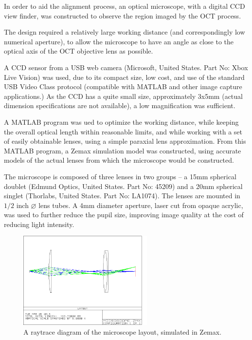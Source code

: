 In order to aid the alignment process, an optical microscope, with a digital CCD view finder, was constructed to observe the region imaged by the OCT process.

The design required a relatively large working distance (and correspondingly low numerical aperture), to allow the microscope to have an angle as close to the optical axis of the OCT objective lens as possible.

A CCD sensor from a USB web camera (Microsoft, United States. Part No: Xbox Live Vision) was used, due to its compact size, low cost, and use of the standard USB Video Class protocol (compatible with MATLAB and other image capture applications.) As the CCD has a quite small size, approximately 3x5mm (actual dimension specifications are not available), a low magnification was sufficient.

A MATLAB program was ued to optimize the working distance, while keeping the overall optical length within reasonable limits, and while working with a set of easily obtainable lenses, using a simple paraxial lens approximation. From this MATLAB program, a Zemax simulation model was constructed, using accurate models of the actual lenses from which the microscope would be constructed.

The microscope is composed of three lenses in two groups -- a 15mm spherical doublet (Edmund Optics, United States. Part No: 45209) and a 20mm spherical singlet (Thorlabs, United States. Part No: LA1074). The lenses are mounted in $1/2$ inch $\diameter$ lens tubes. A 4mm diameter aperture, laser cut from opaque acrylic, was used to further reduce the pupil size, improving image quality at the cost of reducing light intensity.

\begin{figure}[h!]
\centering
\includegraphics[width=0.6\textwidth]{Images/Zemax/microscope_layout_2.png}
\caption{A raytrace diagram of the microscope layout, simulated in Zemax.}
\end{figure}

